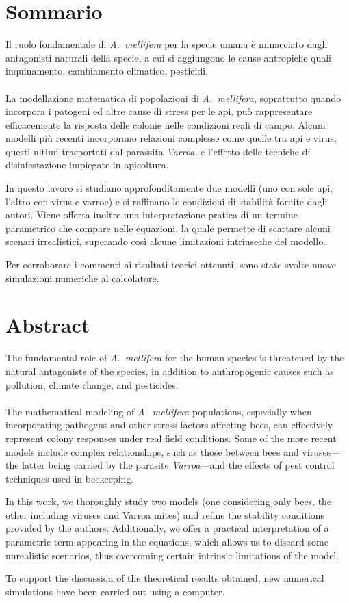 \section*{Sommario}
Il ruolo fondamentale di \emph{A.~mellifera} per la specie umana è minacciato dagli antagonisti naturali della
specie, a cui si aggiungono le cause antropiche quali inquinamento, cambiamento climatico, pesticidi.

\paragraph{}
La modellazione matematica di popolazioni di \emph{A.~mellifera}, soprattutto quando incorpora i patogeni ed
altre cause di stress per le api, può rappresentare efficacemente la risposta delle colonie nelle condizioni
reali di campo.
Alcuni modelli più recenti incorporano relazioni complesse come quelle tra api e virus, questi
ultimi trasportati dal parassita \emph{Varroa}, e l'effetto delle tecniche di disinfestazione
impiegate in apicoltura.

In questo lavoro si studiano approfonditamente due modelli (uno con sole api, l'altro con virus e varroe)
e si raffinano le condizioni di stabilità fornite dagli autori. Viene offerta inoltre una interpretazione
pratica di un termine parametrico che compare nelle equazioni, la quale permette di scartare alcuni scenari
irrealistici, superando così alcune limitazioni intrinseche del modello.

Per corroborare i commenti ai risultati teorici ottenuti, sono state svolte nuove simulazioni numeriche al calcolatore.

\vspace{1cm}
\section*{Abstract}
The fundamental role of \emph{A.~mellifera} for the human species is threatened by the natural antagonists of
the species, in addition to anthropogenic causes such as pollution, climate change, and pesticides.

\paragraph{}
The mathematical modeling of \emph{A.~mellifera} populations, especially when incorporating pathogens and
other stress factors affecting bees, can effectively represent colony responses under real field conditions.
Some of the more recent models include complex relationships, such as those between bees and viruses—
the latter being carried by the parasite \emph{Varroa}—and the effects of pest control techniques used in beekeeping.

In this work, we thoroughly study two models (one considering only bees, the other including viruses and Varroa mites)
and refine the stability conditions provided by the authors. Additionally, we offer a practical interpretation
of a parametric term appearing in the equations, which allows us to discard some unrealistic scenarios,
thus overcoming certain intrinsic limitations of the model.

To support the discussion of the theoretical results obtained, new numerical simulations have been carried out using a computer.
